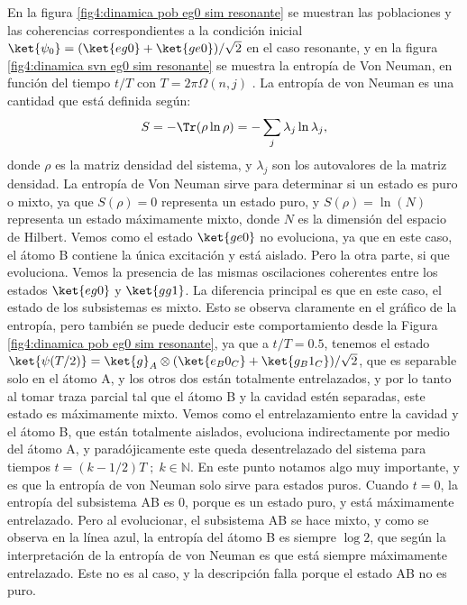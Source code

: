 En la figura \ref{fig4:dinamica pob eg0 sim resonante} se muestran las poblaciones y las coherencias correspondientes a la condición inicial $\ket{\psi_0}=(\ket{eg0} + \ket{ge0})/\sqrt{2}$ en el caso resonante, y en la figura \ref{fig4:dinamica svn eg0 sim resonante} se muestra la entropía de Von Neuman, en función del tiempo $t/T$ con $T=2 \pi \Omega(n,j)$  . La entropía de von Neuman es una cantidad que está definida según:
\begin{equation}\label{ec4:entropia von neuman}
    S=-\Tr(\rho \ln \rho)=-\sum_j \lambda_j \ln \lambda_j,
\end{equation}
donde $\rho$ es la matriz densidad del sistema, y $\lambda_j$ son los autovalores de la matriz densidad. La entropía de Von Neuman sirve para determinar si un estado es puro o mixto, ya que $S(\rho)=0$ representa un estado puro, y $S(\rho)=\ln(N)$ representa un estado máximamente mixto, donde $N$ es la dimensión del espacio de Hilbert.
Vemos como el estado $\ket{ge0}$ no evoluciona, ya que en este caso, el átomo B contiene la única excitación y está aislado. Pero la otra parte, si que evoluciona. Vemos la presencia de las mismas oscilaciones coherentes entre los estados $\ket{eg0}$ y $\ket{gg1}$. La diferencia principal es que en este caso, el estado de los subsistemas es mixto. Esto se observa claramente en el gráfico de la entropía, pero también se puede deducir este comportamiento desde la Figura \ref{fig4:dinamica pob eg0 sim resonante}, ya que a $t/T=0.5$, tenemos el estado $\ket{\psi(T/2)}=\ket{g}_A\otimes(\ket{e_B0_C}+\ket{g_B1_C})/\sqrt{2}$, que es separable solo en el átomo A, y los otros dos están totalmente entrelazados, y por lo tanto al tomar traza parcial tal que el átomo B y la cavidad estén separadas, este estado es máximamente mixto. Vemos como el entrelazamiento entre la cavidad y el átomo B, que están totalmente aislados, evoluciona indirectamente por medio del átomo A, y paradójicamente este queda desentrelazado del sistema para tiempos $t=(k-1/2)T\; ; \; k \in \mathbb{N}$. En este punto notamos algo muy importante, y es que la entropía de von Neuman solo sirve para estados puros. Cuando $t=0$, la entropía del subsistema AB es 0, porque es un estado puro, y está máximamente entrelazado. Pero al evolucionar, el subsistema AB se hace mixto, y como se observa en la línea azul, la entropía del átomo B es siempre $\log 2$, que según la interpretación de la entropía de von Neuman es que está siempre máximamente entrelazado. Este no es al caso, y la descripción falla porque el estado AB no es puro.

